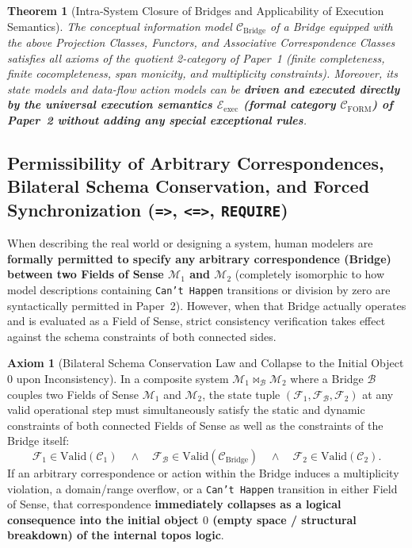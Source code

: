 \documentclass[11pt,a4paper]{article}
\theoremstyle{definition}
\newtheorem{axiom}{Axiom}[section]
\theoremstyle{plain}
\newtheorem{theorem}{Theorem}[section]
\theoremstyle{remark}
\newcommand{\Valid}{\mathrm{Valid}}
\newcommand{\CFORM}{\mathcal{C}_{\mathrm{FORM}}}
\newcommand{\CBridge}{\mathcal{C}_{\mathrm{Bridge}}}
\newcommand{\Eexec}{\mathcal{E}_{\mathrm{exec}}}
\begin{document}
\begin{theorem}[Intra-System Closure of Bridges and Applicability of Execution Semantics]\label{thm:bridge-closure}
The conceptual information model $\CBridge$ of a Bridge equipped with the above Projection Classes, Functors, and Associative Correspondence Classes satisfies all axioms of the quotient 2-category of Paper~1 (finite completeness, finite cocompleteness, span monicity, and multiplicity constraints). Moreover, its state models and data-flow action models can be \textbf{driven and executed directly by the universal execution semantics $\Eexec$ (formal category $\CFORM$) of Paper~2 without adding any special exceptional rules}.
\end{theorem}

\subsection{Permissibility of Arbitrary Correspondences, Bilateral Schema Conservation, and Forced Synchronization (\texttt{=>}, \texttt{<=>}, \texttt{REQUIRE})}
When describing the real world or designing a system, human modelers are \textbf{formally permitted to specify any arbitrary correspondence (Bridge) between two Fields of Sense $\mathcal{M}_1$ and $\mathcal{M}_2$} (completely isomorphic to how model descriptions containing \texttt{Can't Happen} transitions or division by zero are syntactically permitted in Paper~2). However, when that Bridge actually operates and is evaluated as a Field of Sense, strict consistency verification takes effect against the schema constraints of both connected sides.

\begin{axiom}[Bilateral Schema Conservation Law and Collapse to the Initial Object $0$ upon Inconsistency]\label{ax:bilateral-conservation}
In a composite system $\mathcal{M}_1 \bowtie_{\mathcal{B}} \mathcal{M}_2$ where a Bridge $\mathcal{B}$ couples two Fields of Sense $\mathcal{M}_1$ and $\mathcal{M}_2$, the state tuple $(\mathcal{F}_1, \mathcal{F}_{\mathcal{B}}, \mathcal{F}_2)$ at any valid operational step must simultaneously satisfy the static and dynamic constraints of both connected Fields of Sense as well as the constraints of the Bridge itself:
\begin{equation}
\mathcal{F}_1 \in \Valid(\mathcal{C}_1) \quad \wedge \quad \mathcal{F}_{\mathcal{B}} \in \Valid(\CBridge) \quad \wedge \quad \mathcal{F}_2 \in \Valid(\mathcal{C}_2).
\end{equation}
If an arbitrary correspondence or action within the Bridge induces a multiplicity violation, a domain/range overflow, or a \texttt{Can't Happen} transition in either Field of Sense, that correspondence \textbf{immediately collapses as a logical consequence into the initial object $0$ (empty space / structural breakdown) of the internal topos logic}.
\end{axiom}
\end{document}
